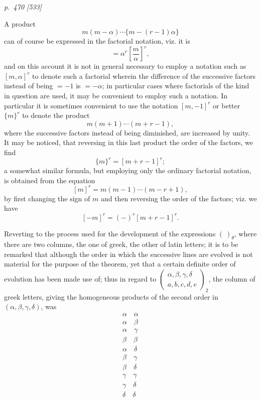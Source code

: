 \documentclass[11pt,a4paper]{article}
\theoremstyle{plain}
\theoremstyle{definition}
\begin{document}
\bigskip
\textit{p.~470 [533]}
\smallskip

\noindent

A product
\[
m(m-\alpha)\cdots\{m-(r-1)\alpha\}
\]
can of course be expressed in the factorial notation, viz. it is
\[
=\alpha^{r}\left[\frac{m}{\alpha}\right]^{r},
\]
and on this account it is not in general necessary to employ a notation such as
\([m,\alpha]^{r}\) to denote such a factorial wherein the difference of the successive
factors instead of being \(=-1\) is \(=-\alpha\); in particular cases where factorials of
the kind in question are used, it may be convenient to employ such a notation. In particular
it is sometimes convenient to use the notation \([m,-1]^{r}\) or better \(\{m\}^{r}\) to
denote the product
\[
m(m+1)\cdots(m+r-1),
\]
where the successive factors instead of being diminished, are increased by unity. It may
be noticed, that reversing in this last product the order of the factors, we find
\[
\{m\}^{r}=[m+r-1]^{r};
\]
a somewhat similar formula, but employing only the ordinary factorial notation, is obtained
from the equation
\[
[m]^{r}=m(m-1)\cdots(m-r+1),
\]
by first changing the sign of \(m\) and then reversing the order of the factors; viz. we have
\[
[-m]^{r}=(-)^{r}[m+r-1]^{r}.
\]

Reverting to the process used for the development of the expressions \((\ )_{\theta}\),
where there are two columns, the one of greek, the other of latin letters; it is to be
remarked that although the order in which the successive lines are evolved is not material
for the purpose of the theorem, yet that a certain definite order of evolution has been
made use of; thus in regard to
\(\left(\begin{array}{c}\alpha,\beta,\gamma,\delta\\a,b,c,d,e\end{array}\right)_{2}\),
the column of greek letters, giving the homogeneous products of the second order in
\((\alpha,\beta,\gamma,\delta)\), was
\[
\begin{array}{c}
\alpha\quad\alpha\\
\alpha\quad\beta\\
\alpha\quad\gamma\\
\beta\quad\beta\\
\alpha\quad\delta\\
\beta\quad\gamma\\
\beta\quad\delta\\
\gamma\quad\gamma\\
\gamma\quad\delta\\
\delta\quad\delta
\end{array}
\]
\end{document}
